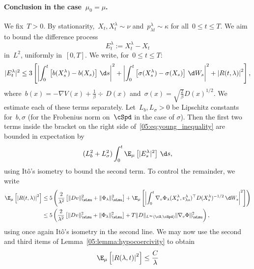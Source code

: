 \paragraph{Conclusion in the case~$\mu_0=\mu$.}
We fix~$T>0$. By stationarity,~$X_t,X_t^\lambda\sim \nu$ and~$p_{\lambda t}^\lambda\sim\kappa$ for all~$0\leq t\leq T$. We aim to bound the difference process
\begin{equation}
    E_t^\lambda := X_t^\lambda - X_t
\end{equation}
in~$L^2$, uniformly in~$[0,T]$. We write, for~$0\leq t \leq T$:
\begin{equation}
    \label{05:eq:young_inequality}
        |E_t^\lambda|^2 \leq 3 \left[\left|\int_0^t \left[b(X_s^\lambda)-b(X_s)\right]\,\d s\right|^2+\left|\int_0^t \left[\sigma(X_s^\lambda)-\sigma(X_s)\right]\,\d W_s\right|^2 + \left|R(t,\lambda)\right|^2\right],
\end{equation}
where~$b(x) = -\nabla V(x) + \frac1\beta\div\, D(x)$ and~$\sigma(x) = \sqrt{\frac2\beta}D(x)^{1/2}$. We estimate each of these terms separately. Let~$L_b,L_\sigma>0$ be Lipschitz constants for~$b,\sigma$ (for the Frobenius norm on~$\cSpd$ in the case of $\sigma$).
Then the first two terms inside the bracket on the right side of~\eqref{05:eq:young_inequality} are bounded in expectation by
\begin{equation}
    \label{05:eq:lipschitz_bound}
    (L_b^2+L_\sigma^2)\int_0^t \E_\mu\left[|E_s^\lambda|^2\right]\,\d s,
\end{equation}
 using It\^o's isometry to bound the second term. To control the remainder, we write
 \begin{equation}
    \begin{aligned}
    \E_\mu\left[\left|R(t,\lambda)\right|^2\right] &\leq 5\left(\frac{2}{\lambda^2}\left[\|Dv\|^2_{\wLmu}+\|\Phi_\lambda\|^2_{\wLmu}\right] + \E_\mu\left[\left|\int_0^t \nabla_v \Phi_\lambda(X_s^\lambda,v_{\lambda s}^\lambda)^\top D(X_s^\lambda)^{-1/2}\,\d W_s\right|^2\right]\right)\\
    &\leq 5\left(\frac{2}{\lambda^2}\left[\|Dv\|^2_{\wLmu}+\|\Phi_\lambda\|^2_{\wLmu}\right] + T\|D\|_{L^\infty(\cX;\cSpd)}\|\nabla_v\Phi\|^2_{\wLmu}\right),
    \end{aligned}
 \end{equation}
using once again It\^o's isometry in the second line. We may now use the second and third items of Lemma~\ref{05:lemma:hypocoercivity} to obtain
\begin{equation}
    \label{05:eq:l2_bounds}
    \E_\mu\left[\left|R(\lambda,t)\right|^2\right] \leq \frac{C}{\lambda}
\end{equation}
